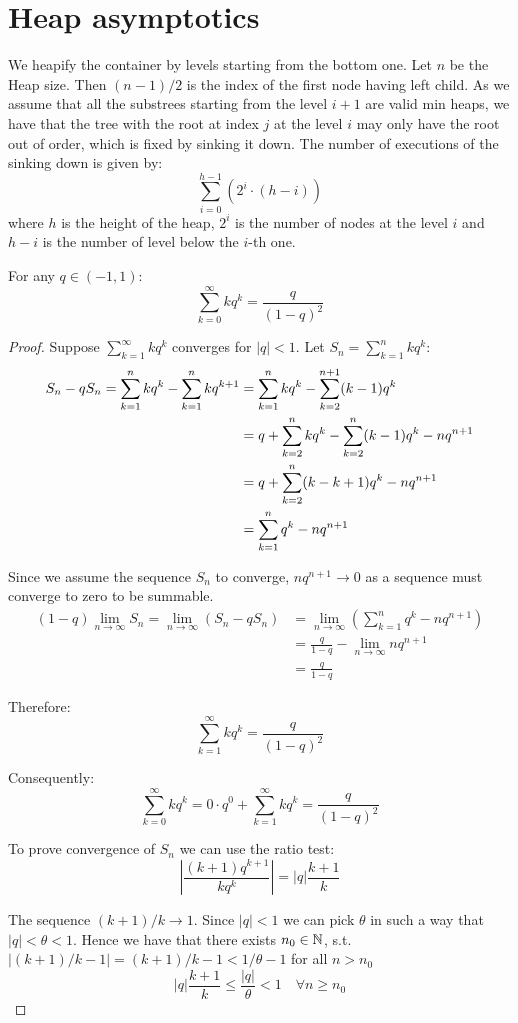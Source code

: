 \section{Heap asymptotics}
We heapify the container by levels starting from the bottom one. Let $n$ be the Heap size. Then $(n - 1) / 2$ is the index of the first node having left child. As we assume that all the substrees starting from the level $i + 1$ are valid min heaps, we have that the tree with the root at index $j$ at the level $i$ may only have the root out of order, which is fixed by sinking it down. The number of executions of the sinking down is given by:
\[\sum_{i=0}^{h-1} (2^i \cdot (h - i))\]
where $h$ is the height of the heap, $2^i$ is the number of nodes at the level $i$ and $h - i$ is the number of level below the $i$-th one.

\begin{lemma}
    For any $q \in (-1, 1)$:
    \[\sum_{k=0}^{\infty} k q^k = \frac{q}{(1 - q)^2}\]
\end{lemma}
\begin{proof}
    Suppose $\sum_{k=1}^{\infty} k {q}^k$ converges for $|q| < 1$. Let $S_n = \sum_{k=1}^{n} k {q}^k$:
    \begin{align}
        S_n - qS_n
        = \sum_{k=1}^{n} k {q}^k - \sum_{k=1}^{n} k q^{k+1}
         & = \sum_{k=1}^{n} k {q}^k - \sum_{k=2}^{n+1} (k-1) q^k \notag
        \\ &= q + \sum_{k=2}^{n} k {q}^k - \sum_{k=2}^{n} (k-1) q^k - nq^{n+1} \notag
        \\ &= q + \sum_{k=2}^{n} (k - k + 1) q^k - nq^{n+1} \notag
        \\ &= \sum_{k=1}^{n} q^k - nq^{n+1} \notag
    \end{align}

    Since we assume the sequence $S_n$ to converge, $nq^{n+1} \to 0$ as a sequence must converge to zero to be summable.
    \begin{align*}
        (1-q)\lim_{n \to \infty} S_n
        = \lim_{n \to \infty} (S_n - qS_n)
         & = \lim_{n \to \infty} \left(\sum_{k=1}^{n} q^k - nq^{n+1} \right)
        \\ &= \frac{q}{1-q} - \lim_{n \to \infty} nq^{n+1}
        \\ &= \frac{q}{1-q}
    \end{align*}

    Therefore:
    \[\sum_{k=1}^{\infty} k {q}^k = \frac{q}{{(1-q)}^2}\]

    Consequently:
    \[\sum_{k=0}^{\infty} k q^k
    = 0 \cdot q^0 + \sum_{k=1}^{\infty} k q^k
    = \frac{q}{(1 - q)^2}\]

    To prove convergence of $S_n$ we can use the ratio test:
    \[\left|\frac{(k+1)q^{k+1}}{kq^k} \right|
        = |q|\frac{k+1}{k}\]

    The sequence $(k+1)/k \to 1$. Since $|q| < 1$ we can pick $\theta$ in such a way that $|q| < \theta < 1$. Hence we have that there exists $n_0 \in \mathbb{N}$, s.t. $|(k+1)/k - 1| = (k+1)/k - 1 < 1 / \theta - 1$ for all $n > n_0$
    \[|q|\frac{k+1}{k} \leq \frac{|q|}{\theta} < 1 \quad \forall n\geq n_0\]
\end{proof}

